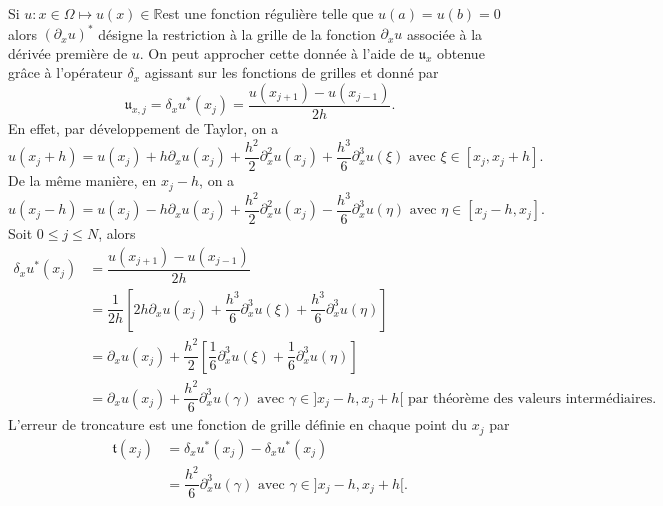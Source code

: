 Si $u : x \in \Omega \mapsto u(x) \in \mathbb{R}$est une fonction régulière telle que $u(a) = u(b) = 0$ alors $(\partial_x u)^*$ désigne la restriction à la grille de la fonction $\partial_x u$ associée à la dérivée première de $u$. On peut approcher cette donnée à l'aide de $\mathfrak{u}_x$ obtenue grâce à l'opérateur $\delta_x$ agissant sur les fonctions de grilles et donné par
\begin{equation}
\mathfrak{u}_{x,j} = \delta_x u^*(x_j) = \dfrac{u(x_{j+1}) - u(x_{j-1})}{2h}.
\end{equation}
En effet, par développement de Taylor, on a 
\begin{equation}
u(x_j+h) = u(x_j) + h \partial_x u(x_j) + \dfrac{h^2}{2} \partial_x^2 u(x_j) + \dfrac{h^3}{6} \partial_x^3 u(\xi) \text{ avec } \xi \in [x_j, x_j+h].
\end{equation}
De la même manière, en $x_j-h$, on a 
\begin{equation}
u(x_j-h) = u(x_j) - h \partial_x u(x_j) + \dfrac{h^2}{2} \partial_x^2 u(x_j) - \dfrac{h^3}{6} \partial_x^3 u(\eta) \text{ avec } \eta \in [x_j-h, x_j].
\end{equation}
Soit $0 \leq j \leq N$, alors
\begin{align*}
\delta_x u^*(x_j) & = \dfrac{u(x_{j+1}) - u(x_{j-1})}{2h}\\
                  & = \dfrac{1}{2h} \left[ 2h \partial_x u(x_j) + \dfrac{h^3}{6} \partial_x^3 u(\xi) + \dfrac{h^3}{6} \partial_x^3 u(\eta) \right]\\
                  & = \partial_x u(x_j) + \dfrac{h^2}{2} \left[ \dfrac{1}{6} \partial_x^3 u(\xi) + \dfrac{1}{6} \partial_x^3 u(\eta) \right] \\
                  & = \partial_x u(x_j) + \dfrac{h^2}{6} \partial_x^3 u(\gamma) \text{ avec } \gamma \in ]x_j-h , x_j+h[ \text{ par théorème des valeurs intermédiaires.}
\end{align*}
L'erreur de troncature est une fonction de grille définie en chaque point du $x_j$ par
\begin{align*}
\mathfrak{t}(x_j) & = \delta_x u^*(x_j) - \delta_x u^*(x_j)\\
                  & = \dfrac{h^2}{6} \partial_x^3 u(\gamma) \text{ avec } \gamma \in ]x_j-h , x_j+h[.
\end{align*}




















